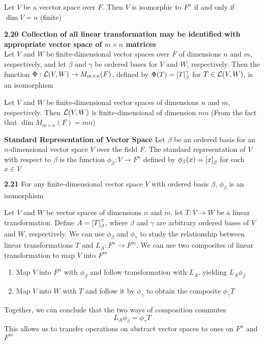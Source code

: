\documentclass[11pt]{article}
\begin{document}
\begin{corollary*}
    Let $V$ be a vecctor space over $F$. Then $V$ is isomorphic to $F^n$ if and only if $\dim{V}=n$ (finite)
\end{corollary*}


\begin{theorem*}
    \textbf{2.20 Collection of all linear transformation may be identified with appropriate vector space of $m\times n$ matrices} \\ 
    Let $V$ and $W$ be finite-dimensional vector spaces over $F$ of dimensions $n$ and $m$, respectively, and let $\beta$ and $\gamma$ be ordered bases for $V$ and $W$, respectively. Then the function $\Phi:\mathcal{L}(V,W) \to M_{m\times n}(F)$, defined by $\Phi(T) = \left[ T \right]_{\beta}^{\gamma}$ for $T\in \mathcal{L}(V,W)$, is an isomorphism
\end{theorem*}


\begin{corollary*}
    Let $V$ and $W$ be finite-dimensional vector spaces of dimensions $n$ and $m$, respectively. Then $\mathcal{L}(V,W)$ is finite-dimensional of dimension $mn$ (From the fact that $\dim{M_{m\times n}(F)} = mn$)
\end{corollary*}

\begin{defn*}
    \textbf{Standard Representation of Vector Space} Let $\beta$ be an ordered basis for an $n$-dimensional vector space $V$ over the field $F$. The standard representation of $V$ with respect to $\beta$ is the function $\phi_{\beta}:V\to F^n$ defined by $\phi_{\beta}(x) = \left[ x \right]_{\beta}$ for each $x\in V$ 
\end{defn*}

\begin{theorem*}
    \textbf{2.21} For any finite-dimensional vector space $V$ with ordered basis $\beta$, $\phi_{\beta}$ is an isomorphism
\end{theorem*}


\begin{defn*}
    Let $V$ and $W$ be vector spaces of dimensions $n$ and $m$. let $T:V\to W$ be a linear transformation. Define $A=\left[ T \right]_{\beta}^{\gamma}$, where $\beta$ and $\gamma$ are arbitrary ordered bases of $V$ and $W$, respectively. We can use $\phi_{\beta}$ and $\phi_{\gamma}$ to study the relationship between linear transformations $T$ and $L_A:F^n \to F^m$. We can use two composites of linear transformation to map $V$ into $F^m$ 
    \begin{enumerate}
        \item Map $V$ into $F^n$ with $\phi_{\beta}$ and follow transformation with $L_A$, yielding $L_A \phi_{\beta}$ 
        \item Map $V$ into $W$ with $T$ and follow it by $\phi_{\gamma}$ to obtain the composite $\phi_{\gamma} T$ 
    \end{enumerate}
    Together, we can conclude that the two ways of composition commutes 
    \[
        L_A \phi_{\beta} = \phi_{\gamma} T
    \]
    This allows us to transfer operations on abstract vector spaces to ones on $F^n$ and $F^m$
\end{defn*}
\end{document}
